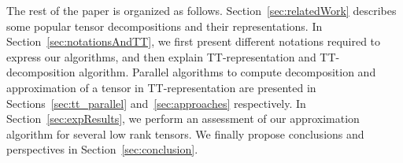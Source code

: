 \documentclass[sigconf]{acmart}
\begin{document}

The rest of the paper is organized as follows. Section~\ref{sec:relatedWork} describes some popular tensor decompositions and their representations. In Section~\ref{sec:notationsAndTT}, we first present different notations required to express our algorithms, and then explain TT-representation and TT-decomposition algorithm. Parallel algorithms to compute decomposition and approximation of a tensor in TT-representation are presented in Sections~\ref{sec:tt_parallel} and~\ref{sec:approaches} respectively. In Section~\ref{sec:expResults}, we perform an assessment of our approximation algorithm for several low rank tensors. We finally propose conclusions and perspectives in Section~\ref{sec:conclusion}.
\end{document}
